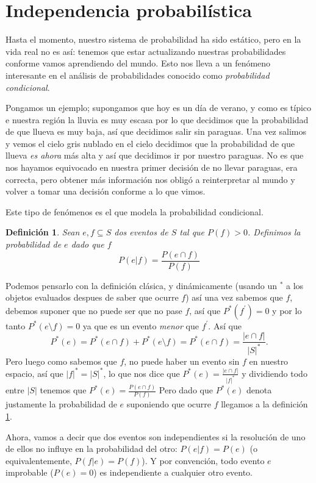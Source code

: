 \documentclass[spanish]{report}
\newtheorem{defi}[thm]{Definición}
\newcommand{\card}[1]{\left|#1 \right|}
\begin{document}
\section{Independencia probabilística}

Hasta el momento, nuestro sistema de probabilidad ha sido estático, pero en la vida real no es así: tenemos que estar actualizando nuestras probabilidades conforme vamos aprendiendo del mundo. Esto nos lleva a un fenómeno interesante en el análisis de probabilidades conocido como \textit{probabilidad condicional}.

Pongamos un ejemplo; supongamos que hoy es un día de verano, y como es típico e nuestra región la lluvia es muy escasa por lo que decidimos que la probabilidad de que llueva es muy baja, así que decidimos salir sin paraguas. Una vez salimos y vemos el cielo gris nublado en el cielo decidimos que la probabilidad de que llueva \textit{es ahora} más alta y así que decidimos ir por nuestro paraguas.
No es que nos hayamos equivocado en nuestra primer decisión de no llevar paraguas, era correcta, pero obtener más información nos obligó a reinterpretar al mundo y volver a tomar una decisión conforme a lo que vimos.

Este tipo de fenómenos es el que modela la probabilidad condicional.

\begin{defi} \label{def_ProbCondicional}
	Sean $e,f \subseteq S$ dos eventos de $S$ tal que $P(f) > 0$. Definimos la probabilidad de $e$ dado que $f$
	\[P(e | f) = \dfrac{P(e \cap f)}{P(f)} \]
\end{defi}

Podemos pensarlo con la definición clásica, y dinámicamente (usando un $^*$ a los objetos evaluados despues de saber que ocurre $f$) así una vez sabemos que $f$, debemos suponer que no puede ser que no pase $f$, así que $P^*(f^\prime) = 0 $ y por lo tanto $P^*(e \setminus f) = 0$ ya que es un evento \emph{menor} que $f^\prime$.
Así que \[P^* (e) = P^* (e \cap f) + P^*(e \setminus f) =P^* (e \cap f) = \dfrac{\card{e \cap f}}{\card{S}^*}. \]Pero luego como sabemos que $f$, no puede haber un evento sin $f$ en nuestro espacio, así que $\card{f}^* = \card{S}^*$, lo que nos dice que $P^*(e)=\frac{\card{e \cap f}}{\card{f}^*}$ y dividiendo todo entre $\card{S}$ tenemos que $P^* (e) = \frac{P(e \cap f)}{P(f)}$
Pero dado que $P^* (e)$ denota justamente la probabilidad de $e$ suponiendo que ocurre $f$ llegamos a la definición \ref{def_ProbCondicional}.

Ahora, vamos a decir que dos eventos son independientes si la resolución de uno de ellos no influye en la probabilidad del otro: $P(e|f)=P(e)$ (o equivalentemente, $P(f|e) = P(f)$). Y por convención, todo evento $e$ improbable ($P(e) = 0$) es independiente a cualquier otro evento.
\end{document}
